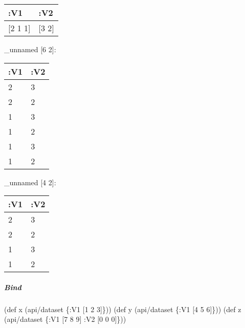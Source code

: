 \documentclass[]{article}
\newenvironment{Shaded}{\begin{snugshade}}{\end{snugshade}}
\newcommand{\KeywordTok}[1]{\textcolor[rgb]{0.13,0.29,0.53}{\textbf{#1}}}
\newcommand{\DecValTok}[1]{\textcolor[rgb]{0.00,0.00,0.81}{#1}}
\newcommand{\FunctionTok}[1]{\textcolor[rgb]{0.00,0.00,0.00}{#1}}
\newcommand{\VariableTok}[1]{\textcolor[rgb]{0.00,0.00,0.00}{#1}}
\newcommand{\BuiltInTok}[1]{#1}
\newcommand{\AttributeTok}[1]{\textcolor[rgb]{0.77,0.63,0.00}{#1}}
\newcommand{\NormalTok}[1]{#1}
\let\oldsubparagraph\subparagraph
\renewcommand{\subparagraph}[1]{\oldsubparagraph{#1}\mbox{}}
\begin{document}
\begin{longtable}[]{@{}ll@{}}
\toprule
:V1 & :V2\tabularnewline
\midrule
\endhead
{[}2 1 1{]} & {[}3 2{]}\tabularnewline
\bottomrule
\end{longtable}

\begin{Shaded}
\end{Shaded}

\_unnamed {[}6 2{]}:

\begin{longtable}[]{@{}ll@{}}
\toprule
:V1 & :V2\tabularnewline
\midrule
\endhead
2 & 3\tabularnewline
2 & 2\tabularnewline
1 & 3\tabularnewline
1 & 2\tabularnewline
1 & 3\tabularnewline
1 & 2\tabularnewline
\bottomrule
\end{longtable}

\begin{Shaded}
\end{Shaded}

\_unnamed {[}4 2{]}:

\begin{longtable}[]{@{}ll@{}}
\toprule
:V1 & :V2\tabularnewline
\midrule
\endhead
2 & 3\tabularnewline
2 & 2\tabularnewline
1 & 3\tabularnewline
1 & 2\tabularnewline
\bottomrule
\end{longtable}

\subparagraph{Bind}\label{bind-1}

\begin{Shaded}
\begin{Highlighting}[]
\NormalTok{(}\BuiltInTok{def}\FunctionTok{ x }\NormalTok{(api/dataset \{}\AttributeTok{:V1}\NormalTok{ [}\DecValTok{1} \DecValTok{2} \DecValTok{3}\NormalTok{]\}))}
\NormalTok{(}\BuiltInTok{def}\FunctionTok{ y }\NormalTok{(api/dataset \{}\AttributeTok{:V1}\NormalTok{ [}\DecValTok{4} \DecValTok{5} \DecValTok{6}\NormalTok{]\}))}
\NormalTok{(}\BuiltInTok{def}\FunctionTok{ z }\NormalTok{(api/dataset \{}\AttributeTok{:V1}\NormalTok{ [}\DecValTok{7} \DecValTok{8} \DecValTok{9}\NormalTok{]}
                     \AttributeTok{:V2}\NormalTok{ [}\DecValTok{0} \DecValTok{0} \DecValTok{0}\NormalTok{]\}))}
\end{Highlighting}
\end{Shaded}
\end{document}
